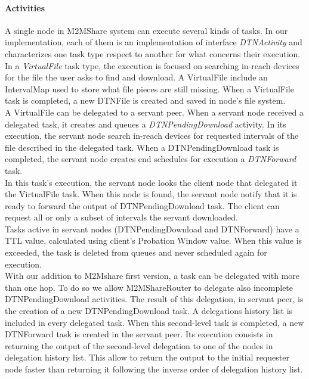 \paragraph{Activities}
A single node in M2MShare system can execute several kinds of tasks. In our implementation, each of them is an implementation of interface \textit{DTNActivity} and characterizes one task type respect to another for what concerns their execution. 
\\
In a \textit{VirtualFile} task type, the execution is focused on searching in-reach devices for the file the user asks to find and download. A VirtualFile include an IntervalMap used to store what file pieces are still missing. When a VirtualFile task is completed, a new DTNFile is created and saved in node's file system. 
\\
A VirtualFile can be delegated to a servant peer. When a servant node received a delegated task, it creates and queues a \textit{DTNPendingDownload} activity. In its execution, the servant node search in-reach devices for requested intervals of the file described in the delegated task. When a DTNPendingDownload task is completed, the servant node creates end schedules for execution a \textit{DTNForward} task.
\\
In this task's execution, the servant node looks the client node that delegated it the VirtualFile task. When this node is found, the servant node notify that it is ready to forward the output of DTNPendingDownload task. The client can request all or only a subset of intervals the servant downloaded.
\\

Tasks active in servant nodes (DTNPendingDownload and DTNForward) have a TTL value, calculated using client's Probation Window value. When this value is exceeded, the task is deleted from queues and never scheduled again for execution.
\\

With our addition to M2Mshare first version, a task can be delegated with more than one hop. To do so we allow M2MShareRouter to delegate also incomplete DTNPendingDownload activities. The result of this delegation, in servant peer, is the creation of a new DTNPendingDownload task. A delegations history list is included in every delegated task. When this second-level task is completed, a new DTNForward task is created in the servant peer. Its execution consists in returning the output of the second-level delegation to one of the nodes in delegation history list. This allow to return the output to the initial requester node faster than returning it following the inverse order of delegation history list.
\\

